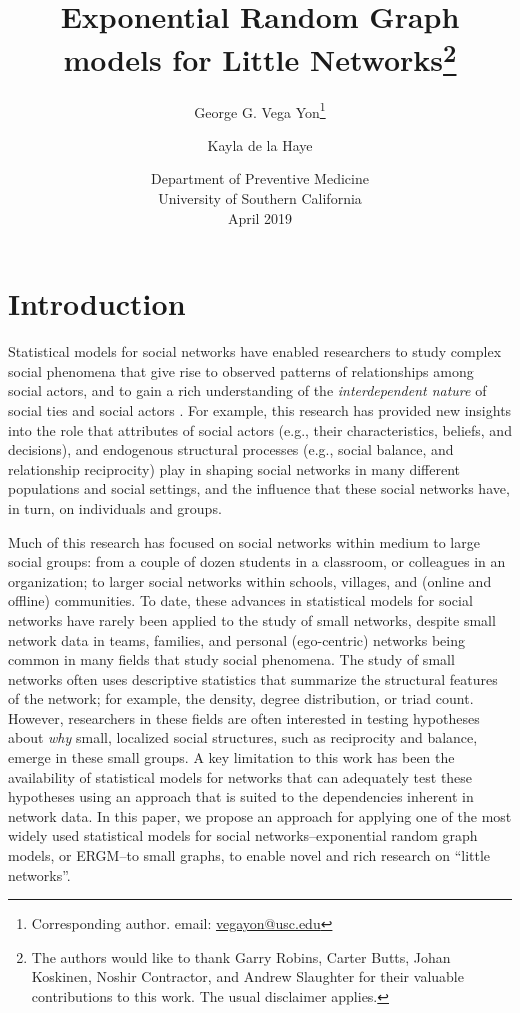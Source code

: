 \documentclass[12pt]{article}
\title{Exponential Random Graph models for Little Networks\footnote{The authors would like to thank Garry Robins, Carter Butts, Johan Koskinen, Noshir Contractor, and Andrew Slaughter for their valuable contributions to this work. The usual disclaimer applies.}}
\author{George G. Vega Yon\footnote{Corresponding author. email: \href{mailto:vegayon@usc.edu}{vegayon@usc.edu}} \and Kayla de la Haye}
\date{Department of Preventive Medicine\\University of Southern California\\ April 2019}
\begin{document}
\maketitle


\section{Introduction}

Statistical models for social networks have enabled researchers to study complex social phenomena that give rise to observed patterns of relationships among social actors, and to gain a rich understanding of the \textit{interdependent nature} of social ties and social actors \cite{Snijders2011,lusher2012exponential}. For example, this research has provided new insights into the role that attributes of social actors (e.g., their characteristics, beliefs, and decisions), and endogenous structural processes (e.g., social balance, and relationship reciprocity) play in shaping social networks in many different populations and social settings, and the influence that these social networks have, in turn, on individuals and groups. 

Much of this research has focused on social networks within medium to large social groups: from a couple of dozen students in a classroom, or colleagues in an organization; to larger social networks within schools, villages, and (online and offline) communities. To date, these advances in statistical models for social networks have rarely been applied to the study of small networks, despite small network data in teams, families, and personal (ego-centric) networks being common in many fields that study social phenomena. The study of small networks often uses descriptive statistics that summarize the structural features of the network; for example, the density, degree distribution, or triad count. However, researchers in these fields are often interested in testing hypotheses about \textit{why} small, localized social structures, such as reciprocity and balance, emerge in these small groups. A key limitation to this work has been the availability of statistical models for networks that can adequately test these hypotheses using an approach that is suited to the dependencies inherent in network data. In this paper, we propose an approach for applying one of the most widely used statistical models for social networks--exponential random graph models, or ERGM--to small graphs, to enable novel and rich research on ``little networks''. 
\end{document}
